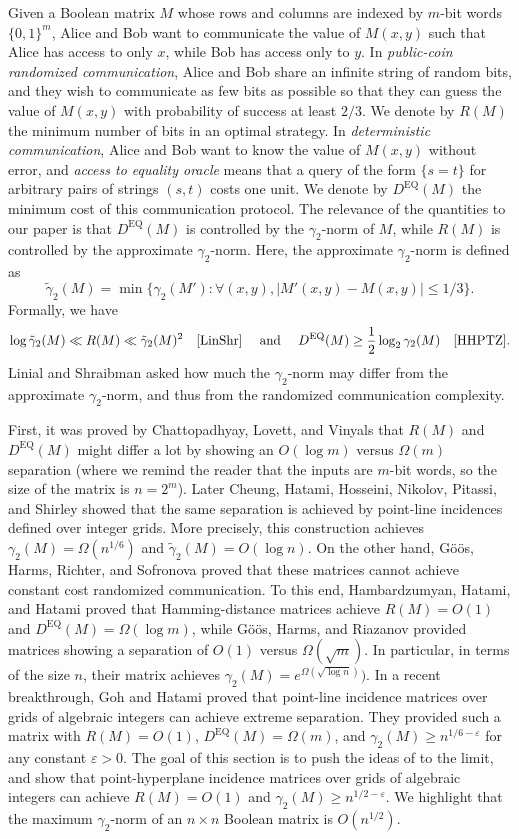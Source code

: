 \documentclass[11pt]{article}
\theoremstyle{plain}
\theoremstyle{definition}
\newcommand{\eps}{\varepsilon}
\begin{document}
	Given a Boolean matrix $M$ whose rows and columns are indexed by $m$-bit words $\{0,1\}^m$, Alice and Bob want to communicate the value of $M(x,y)$ such that Alice has access to only $x$, while Bob has access only to $y$. In \emph{public-coin randomized communication}, Alice and Bob share an infinite string of random bits, and they wish to communicate as few bits as possible so that they can guess the value of $M(x,y)$ with probability of success at least $2/3$. We denote by $R(M)$ the minimum number of bits in an optimal strategy. In \emph{deterministic communication}, Alice and Bob want to know the value of $M(x,y)$ without error, and \emph{access to equality oracle} means that a query of the form $\{s=t\}$ for arbitrary pairs of strings $(s,t)$ costs one unit. We denote by $D^{\text{EQ}}(M)$ the minimum cost of this communication protocol.  The relevance of the quantities to our paper is that $D^{\text{EQ}}(M)$ is controlled by the $\gamma_2$-norm of $M$, while $R(M)$ is controlled by the approximate $\gamma_2$-norm. Here, the approximate $\gamma_2$-norm is defined as
	$$\tilde{\gamma}_2(M)=\min \{\gamma_2(M'):\forall (x,y), |M'(x,y)-M(x,y)|\leq 1/3\}.$$
	Formally, we have
	$$\log \tilde{\gamma}_2(M)\ll R(M)\ll \tilde{\gamma}_2(M)^2\quad\cite{LinShr}\quad\text{ and }\quad D^{\text{EQ}}(M)\geq \frac{1}{2}\log_2 \gamma_2(M)\quad \cite{HHPTZ}.$$
	Linial and Shraibman \cite{LinShr} asked how much the $\gamma_2$-norm may differ from the approximate $\gamma_2$-norm, and thus from the randomized communication complexity.
	
	First, it was proved by Chattopadhyay, Lovett, and Vinyals that $R(M)$ and $D^{\text{EQ}}(M)$ might differ a lot by showing an $O(\log m)$ versus $\Omega(m)$ separation (where we remind the reader that the inputs are $m$-bit words, so the size of the matrix is $n=2^m$). Later Cheung,  Hatami,  Hosseini,  Nikolov,  Pitassi, and  Shirley \cite{CHHNPS} showed that the same separation is achieved by point-line incidences defined over integer grids. More precisely, this construction achieves $\gamma_2(M)=\Omega(n^{1/6})$ and $\tilde{\gamma}_2(M)=O(\log n)$. On the other hand, G\"o\"os, Harms, Richter, and Sofronova \cite{GHRS} proved that these matrices cannot achieve constant cost randomized communication. To this end, Hambardzumyan, Hatami, and Hatami \cite{HHH} proved that Hamming-distance matrices achieve $R(M)=O(1)$ and $D^{\text{EQ}}(M)=\Omega(\log m)$, while G\"o\"os, Harms, and Riazanov \cite{GHR} provided matrices showing a separation of $O(1)$ versus $\Omega(\sqrt{m})$. In particular, in terms of the size $n$, their matrix achieves $\gamma_2(M)=e^{\Omega(\sqrt{\log n})})$. In a recent breakthrough, Goh and Hatami \cite{GH_totally_real} proved that point-line incidence matrices over grids of algebraic integers can achieve extreme separation. They provided such a matrix with $R(M)=O(1)$, $D^{\text{EQ}}(M)=\Omega(m)$, and $\gamma_2(M)\geq n^{1/6-\eps}$ for any constant $\eps>0$. The goal of this section is to push the ideas of \cite{GH_totally_real} to the limit, and show that point-hyperplane incidence matrices over grids of algebraic integers can achieve $R(M)=O(1)$ and $\gamma_2(M)\geq n^{1/2-\eps}$. We highlight that the maximum $\gamma_2$-norm of an $n\times n$ Boolean matrix is $O(n^{1/2})$.
	
\end{document}
